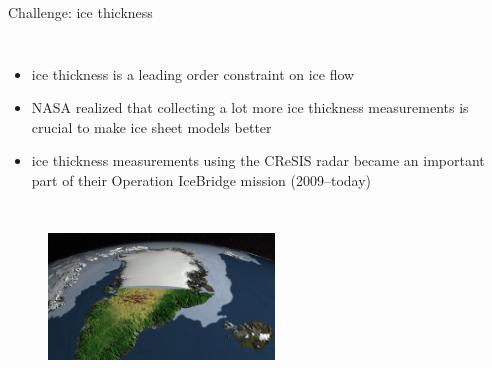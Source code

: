 \documentclass[hide notes,intlimits]{beamer}
\begin{document}
\begin{frame}{Challenge: ice thickness}
\begin{columns}
    \column[c]{10cm}
    \begin{itemize}
    \item ice thickness is a leading order constraint on ice flow
    \item NASA realized that collecting a lot more ice thickness measurements is crucial to make ice sheet models better
    \item ice thickness measurements using the CReSIS radar became an important part of their Operation IceBridge mission (2009--today)
    \end{itemize}
  \end{columns}
  \begin{figure}
    \includegraphics[width=6cm]{canale_grande_V05}
  \end{figure}
\end{frame}
\end{document}
